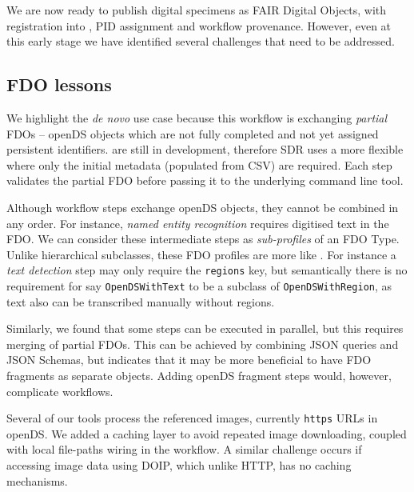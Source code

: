 We are now ready to publish digital specimens as FAIR Digital Objects,
with registration into , PID assignment and workflow provenance. However, even at
this early stage we have identified several challenges that need to be
addressed.

\subsection{FDO lessons}\label{ch7:fdo-lessons}

We highlight the \emph{de novo} use case because this workflow is
exchanging \emph{partial} FDOs -- openDS objects which are not fully
completed and not yet assigned persistent identifiers.
 are still in
development, therefore SDR uses a
more flexible
 where only the initial metadata (populated from CSV) are
required. Each step validates the partial FDO before passing it to the
underlying command line tool.

Although workflow steps exchange openDS objects, they cannot be combined
in any order. For instance, \emph{named entity recognition} requires
digitised text in the FDO. We can consider these intermediate steps as
\emph{sub-profiles} of an FDO Type. Unlike hierarchical subclasses,
these FDO profiles are more like
. For
instance a \emph{text detection} step may only require the
\texttt{regions} key, but semantically there is no requirement for say
\texttt{OpenDSWithText} to be a subclass of \texttt{OpenDSWithRegion},
as text also can be transcribed manually without regions.

Similarly, we found that some steps can be executed in parallel, but
this requires merging of partial FDOs. This can be achieved by combining
JSON queries and JSON Schemas, but indicates that it may be more
beneficial to have FDO fragments as separate objects. Adding openDS
fragment steps would, however, complicate workflows.

Several of our tools process the referenced images, currently \texttt{https} URLs
in openDS. We added a caching layer to avoid repeated image downloading,
coupled with local file-paths wiring in the workflow. A similar
challenge occurs if accessing image data using DOIP, which unlike HTTP,
has no caching mechanisms.

